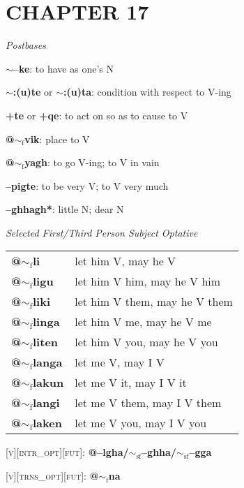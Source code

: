 \documentclass{article}
\begin{document}
\section{CHAPTER 17}

\textit{Postbases}
\begin{description}
\item \textbf{$\sim$--ke}: to have as one's N
\item \textbf{$\sim$:(u)te} or \textbf{$\sim$:(u)ta}: condition with respect to V-ing
\item \textbf{+te} or \textbf{+qe}: to act on so as to cause to V
\item \textbf{@$\sim_\text{f}$vik}: place to V
\item \textbf{@$\sim_\text{f}$yagh}: to go V-ing; to V in vain
\item \textbf{--pigte}: to be very V; to V very much
\item \textbf{--ghhagh*}: little N; dear N
\end{description}

\bigskip

\textit{Selected First/Third Person Subject Optative}

\begin{tabular}{ l l }
\textbf{@$\sim_\text{f}$li} & let him V, may he V \\
\textbf{@$\sim_\text{f}$ligu} & let him V him, may he V him \\
\textbf{@$\sim_\text{f}$liki} & let him V them, may he V them \\
\textbf{@$\sim_\text{f}$linga} & let him V me, may he V me \\
\textbf{@$\sim_\text{f}$liten} & let him V you, may he V you \\
\textbf{@$\sim_\text{f}$langa} & let me V, may I V \\
\textbf{@$\sim_\text{f}$lakun} & let me V it, may I V it \\
\textbf{@$\sim_\text{f}$langi} & let me V them, may I V them \\
\textbf{@$\sim_\text{f}$laken} & let me V you, may I V you
\end{tabular}

\bigskip

\textsc{[v][intr\_opt][fut]}: \textbf{@--lgha/$\sim_\text{sf}$--ghha/$\sim_\text{sf}$--gga}

\textsc{[v][trns\_opt][fut]}: \textbf{@$\sim_\text{f}$na}

\bigskip
\end{document}

